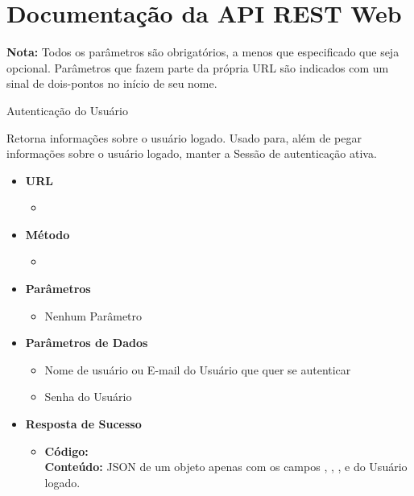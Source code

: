 \chapter{Documentação da API REST Web} \label{anexo:a}

\textbf{Nota:} Todos os parâmetros são obrigatórios, a menos que especificado que seja opcional. Parâmetros que fazem parte da própria URL são indicados com um sinal de dois-pontos no início de seu nome. \\ 

\begin{caixa}{Autenticação do Usuário}{}

Retorna informações sobre o usuário logado. Usado para, além de pegar informações sobre o usuário logado, manter a Sessão de autenticação ativa.

\begin{itemize}
\item \textbf{URL}
	\begin{itemize}
		\item {}
	\end{itemize}

\item \textbf{Método}
	\begin{itemize}
		\item {}
	\end{itemize}

\item \textbf{Parâmetros}
	\begin{itemize}
    	\item Nenhum Parâmetro
	\end{itemize}

\item \textbf{Parâmetros de Dados}
	\begin{itemize}
        \item {} Nome de usuário ou E-mail do Usuário que quer se autenticar
        \item {} Senha do Usuário
	\end{itemize}

\item \textbf{Resposta de Sucesso}
	\begin{itemize}
		\item \textbf{Código:}  \\ \textbf{Conteúdo:} JSON de um objeto  apenas com os campos , , ,  e  do Usuário logado.
	\end{itemize}


\end{itemize}
\end{caixa}
